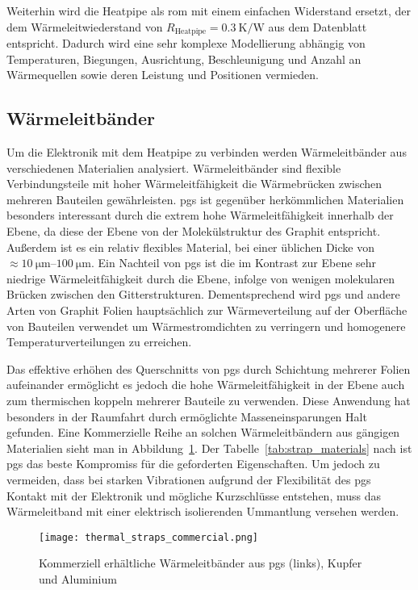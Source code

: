 Weiterhin wird die Heatpipe als \ac{rom} mit einem einfachen Widerstand ersetzt, der dem Wärmeleitwiederstand von $R_\mathrm{Heatpipe} = \SI{0,3}{\kelvin\per\watt}$ aus dem Datenblatt~\cite{QuickOhm-Heatpipe-5x400} entspricht.
Dadurch wird eine sehr komplexe Modellierung abhängig von Temperaturen, Biegungen, Ausrichtung, Beschleunigung und Anzahl an Wärmequellen sowie deren Leistung und Positionen vermieden.

\subsection{Wärmeleitbänder}\label{sec:waermebaender}

Um die Elektronik mit dem Heatpipe zu verbinden werden Wärmeleitbänder aus verschiedenen Materialien analysiert.
Wärmeleitbänder sind flexible Verbindungsteile mit hoher Wärmeleitfähigkeit die Wärmebrücken zwischen mehreren Bauteilen gewährleisten.
\ac{pgs} ist gegenüber herkömmlichen Materialien besonders interessant durch die extrem hohe Wärmeleitfähigkeit innerhalb der Ebene,
da diese der Ebene von der Molekülstruktur des Graphit entspricht. Außerdem ist es ein relativ flexibles Material, bei einer üblichen Dicke von $\approx \SIrange{10}{100}{\micro\meter}$.
Ein Nachteil von \ac{pgs} ist die im Kontrast zur Ebene sehr niedrige Wärmeleitfähigkeit durch die Ebene, infolge von wenigen
molekularen Brücken zwischen den Gitterstrukturen. Dementsprechend wird \ac{pgs} und andere Arten von Graphit Folien hauptsächlich zur
Wärmeverteilung auf der Oberfläche von Bauteilen verwendet um Wärmestromdichten zu verringern und homogenere Temperaturverteilungen zu erreichen.

Das effektive erhöhen des Querschnitts von \ac{pgs} durch Schichtung mehrerer Folien aufeinander ermöglicht es jedoch die hohe
Wärmeleitfähigkeit in der Ebene auch zum thermischen koppeln mehrerer Bauteile zu verwenden. Diese Anwendung hat besonders in der 
Raumfahrt durch ermöglichte Masseneinsparungen Halt gefunden. Eine Kommerzielle Reihe an solchen Wärmeleitbändern aus gängigen Materialien sieht man in Abbildung~\ref{fig:thermalstraps_commercial}.
Der Tabelle~\ref{tab:strap_materials} nach ist \ac{pgs} das beste Kompromiss für die geforderten Eigenschaften. Um jedoch zu vermeiden, dass
bei starken Vibrationen aufgrund der Flexibilität des \ac{pgs} Kontakt mit der Elektronik und mögliche Kurzschlüsse entstehen, muss das Wärmeleitband mit einer elektrisch
isolierenden Ummantlung versehen werden.

\begin{figure}
  \centering
  \texttt{[image: thermal\_straps\_commercial.png]}
  \caption{Kommerziell erhältliche Wärmeleitbänder aus \ac{pgs} (links), Kupfer und Aluminium~\cite{Thermal-Straps}}\label{fig:thermalstraps_commercial}
\end{figure}

